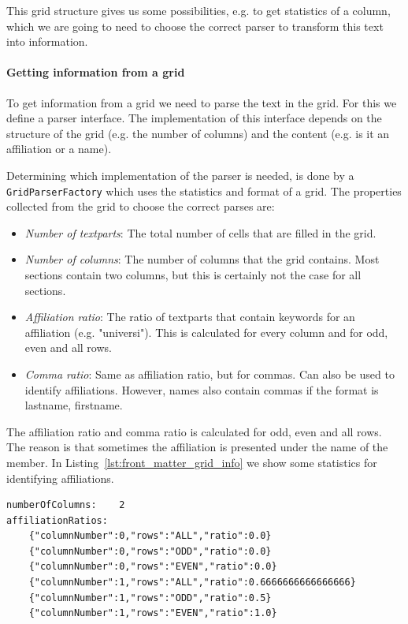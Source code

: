\documentclass{ou-report}
\begin{document}
This grid structure gives us some possibilities, e.g. to get statistics of a
column, which we are going to need to choose the correct parser to transform
this text into information.

\paragraph{Getting information from a grid}
\label{subsec:front_matter_grid_information}
To get information from a grid we need to parse the text in the grid. For 
this we define a parser interface. The implementation of this interface 
depends on the structure of the grid (e.g. the number of columns) and the 
content (e.g. is it an affiliation or a name).

Determining which implementation of the parser is needed, is done by a 
\verb|GridParserFactory| which uses the statistics and format of a grid. The 
properties collected from the grid to choose the correct parses are:
\begin{itemize}
    \item \emph{Number of textparts}: The total number of cells that are filled
    in the grid.
    \item \emph{Number of columns}: The number of columns that the grid
    contains. Most sections contain two columns, but this is certainly not the
    case for all sections.
    \item \emph{Affiliation ratio}: The ratio of textparts that contain keywords
    for an affiliation (e.g. "universi"). This is calculated for every 
    column and for odd, even and all rows.
    \item \emph{Comma ratio}: Same as affiliation ratio, but for commas. Can
    also be used to identify affiliations. However, names also contain 
    commas if the format is lastname, firstname.
\end{itemize}

The affiliation ratio and comma ratio is calculated for odd, even and all
rows. The reason is that sometimes the affiliation is presented under the
name of the member. In Listing~\ref{lst:front_matter_grid_info} we show 
some statistics for identifying affiliations.

\begin{lstlisting}[caption={Some derived information from the grid},captionpos=b,label={lst:front_matter_grid_info}]
numberOfColumns:	2
affiliationRatios:
	{"columnNumber":0,"rows":"ALL","ratio":0.0}
	{"columnNumber":0,"rows":"ODD","ratio":0.0}
	{"columnNumber":0,"rows":"EVEN","ratio":0.0}
	{"columnNumber":1,"rows":"ALL","ratio":0.6666666666666666}
	{"columnNumber":1,"rows":"ODD","ratio":0.5}
	{"columnNumber":1,"rows":"EVEN","ratio":1.0}
\end{lstlisting}
\end{document}
